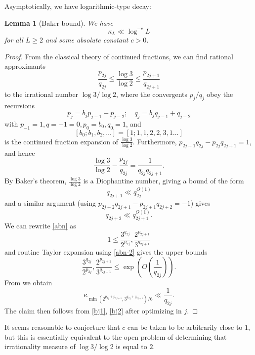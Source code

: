 \documentclass[12pt,a4paper,reqno]{amsart}
\numberwithin{equation}{section}
\theoremstyle{plain}
\newtheorem{lemma}[theorem]{Lemma}
\theoremstyle{definition}
\begin{document}
Asymptotically, we have logarithmic-type decay:

\begin{lemma}[Baker bound]\label{baker} We have
  $$ \kappa_L \ll \log^{-c} L$$
for all $L \geq 2$ and some absolute constant $c>0$.
\end{lemma}


\begin{proof}  From the classical theory of continued fractions, we can find rational approximants
\begin{equation}\label{abn}
 \frac{p_{2j}}{q_{2j}} \leq \frac{\log 3}{\log 2} \leq \frac{p_{2j+1}}{q_{2j+1}}
\end{equation}
to the irrational number $\log 3/\log 2$, where the convergents $p_j/q_j$ obey the recursions
$$ p_j = b_j p_{j-1} + p_{j-2}; \quad q_j = b_j q_{j-1} + q_{j-2}$$
with $p_{-1} = 1, q={-1}=0, p_0 = b_0, q_0=1$, and 
$$[b_0;b_1,b_2,\dots] = [1;1,1,2,2,3,1\dots]$$ 
is the continued fraction expansion of $\frac{\log 3}{\log 2}$.  Furthermore, $p_{2j+1}q_{2j} - p_{2j} q_{2j+1} = 1$, and hence
\begin{equation}\label{abn-2} 
  \frac{\log 3}{\log 2} - \frac{p_{2j}}{q_{2j}} = \frac{1}{q_{2j} q_{2j+1}}.
\end{equation}
By Baker's theorem, $\frac{\log 3}{\log 2}$ is a Diophantine number, giving a bound of the form
\begin{equation}\label{bj1}
   q_{2j+1} \ll q_{2j}^{O(1)}
\end{equation}
and a similar argument (using $p_{2j+2} q_{2j+1}-p_{2j+1} q_{2j+2} = -1$) gives
\begin{equation}\label{bj2}
 q_{2j+2} \ll q_{2j+1}^{O(1)}.
\end{equation}
We can rewrite \eqref{abn} as
$$ 1 \leq \frac{3^{q_{2j}}}{2^{p_{2j}}}, \frac{2^{p_{2j+1}}}{3^{q_{2j+1}}}$$
and routine Taylor expansion using \eqref{abn-2} gives the upper bounds
$$ \frac{3^{q_{2j}}}{2^{p_{2j}}}, \frac{2^{p_{2j+1}}}{3^{q_{2j+1}}}\leq \exp\left( O\left( \frac{1}{q_{2j}}\right)\right).$$
From  we obtain
$$
\kappa_{\min(2^{p_{2j} + p_{2j+1}}, 3^{q_{2j}+q_{2j+1}})/6} \ll \frac{1}{q_{2j}}.$$
The claim then follows from \eqref{bj1}, \eqref{bj2} after optimizing in $j$.

\end{proof}


It seems reasonable to conjecture that $c$ can be taken to be arbitrarily close to $1$, but this is essentially equivalent to the open problem of determining that irrationality measure of $\log 3 / \log 2$ is equal to $2$.
\end{document}
